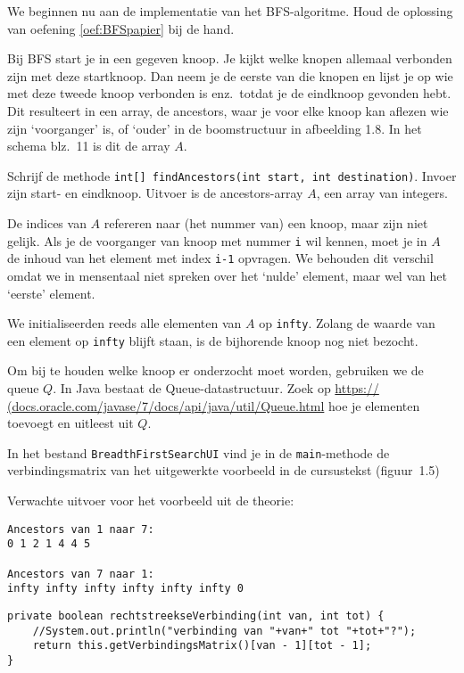 \begin{oef}
\label{nummeringKnopen}
\code We beginnen nu aan de implementatie van het BFS-algoritme. Houd de oplossing van oefening \ref{oef:BFSpapier} bij de hand. 

Bij BFS start je in een gegeven knoop. Je kijkt welke knopen allemaal verbonden zijn met deze startknoop. Dan neem je de eerste van die knopen en lijst je  op wie met deze tweede knoop verbonden is enz.\ totdat je de eindknoop gevonden hebt. Dit resulteert in een array, de ancestors, waar je voor elke knoop kan aflezen wie zijn `voorganger' is, of `ouder' in de boomstructuur in afbeelding 1.8. In het schema blz.\ 11 is dit de array $A$.

Schrijf de methode \verb/int[] findAncestors(int start, int destination)/. Invoer zijn start- en eindknoop. Uitvoer is de ancestors-array $A$, een array van integers. 

De indices van $A$ refereren naar (het nummer van) een knoop, maar zijn niet gelijk. Als je de voorganger van knoop met nummer \verb/i/ wil kennen, moet je in $A$ de inhoud van het element met index \verb/i-1/ opvragen.  We behouden dit verschil omdat we in mensentaal niet spreken over het `nulde' element, maar wel van het `eerste' element.

We initialiseerden reeds alle elementen van  $A$ op \verb/infty/. Zolang de waarde van een element op \verb/infty/ blijft staan, is de bijhorende knoop nog niet bezocht.

Om bij te houden welke knoop er onderzocht moet worden, gebruiken we de queue $Q$. In Java bestaat de Queue-datastructuur. Zoek op  \url{https:// (docs.oracle.com/javase/7/docs/api/java/util/Queue.html} hoe je elementen toevoegt en uitleest uit $Q$. 

In het bestand \verb+BreadthFirstSearchUI+ vind je in de \verb+main+-methode de verbindingsmatrix van het uitgewerkte voorbeeld in de cursustekst (figuur~1.5)

Verwachte uitvoer voor het voorbeeld uit de theorie:
\begin{verbatim}
Ancestors van 1 naar 7:
0 1 2 1 4 4 5 

Ancestors van 7 naar 1:
infty infty infty infty infty infty 0
\end{verbatim}

\begin{opl}
\begin{lstlisting}[caption={findAncestors(int,int)}, label=BFSAncestors]
private boolean rechtstreekseVerbinding(int van, int tot) {
	//System.out.println("verbinding van "+van+" tot "+tot+"?");
	return this.getVerbindingsMatrix()[van - 1][tot - 1];
}


\end{lstlisting}
\end{opl}
\end{oef}
